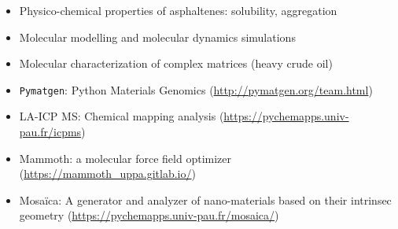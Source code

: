 \documentclass[10pt,a4paper,ragged2e]{../altacv}
\begin{document}
\divider

\vspace{-1mm}
\begin{itemize}
\item Physico-chemical properties of asphaltenes: solubility, aggregation
\item Molecular modelling and molecular dynamics simulations
\item Molecular characterization of complex matrices (heavy crude oil)
\end{itemize}

\divider

\vspace{-1mm}
\begin{itemize}
\item \texttt{Pymatgen}: Python Materials Genomics {(\footnotesize\url{http://pymatgen.org/team.html})}
\item LA-ICP MS: Chemical mapping analysis
{(\footnotesize\url{https://pychemapps.univ-pau.fr/icpms})}
\item Mammoth: a molecular force field optimizer \hbox{(\footnotesize\url{https://mammoth_uppa.gitlab.io/})}
\item Mosaïca: A generator and analyzer of nano-materials based on their intrinsec geometry 
\hbox{(\footnotesize\url{https://pychemapps.univ-pau.fr/mosaica/})}
\end{itemize}






\end{document}

